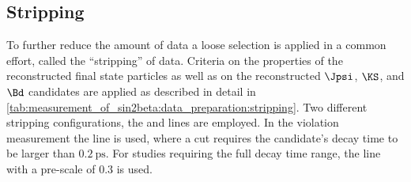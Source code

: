 \subsection{Stripping}
\label{sec:measurement_of_sin2beta:data_preparation:stripping}

To further reduce the amount of data a loose selection is applied in a common
effort, called the \enquote{stripping} of data. Criteria on the properties of
the reconstructed final state particles as well as on the reconstructed $\Jpsi$,
$\KS$, and $\Bd$ candidates are applied as described in detail in 
\cref{tab:measurement_of_sin2beta:data_preparation:stripping}. Two different
stripping configurations, the \StrippingDetached and \StrippingPrescaled lines
are employed. In the \CP violation measurement the \StrippingDetached line is
used, where a cut requires the \Bd candidate's decay time to be larger than
$\SI{0.2}{\pico\second}$. For studies requiring the full decay time range, the
\StrippingPrescaled line with a pre-scale of $\num{0.3}$ is used.

